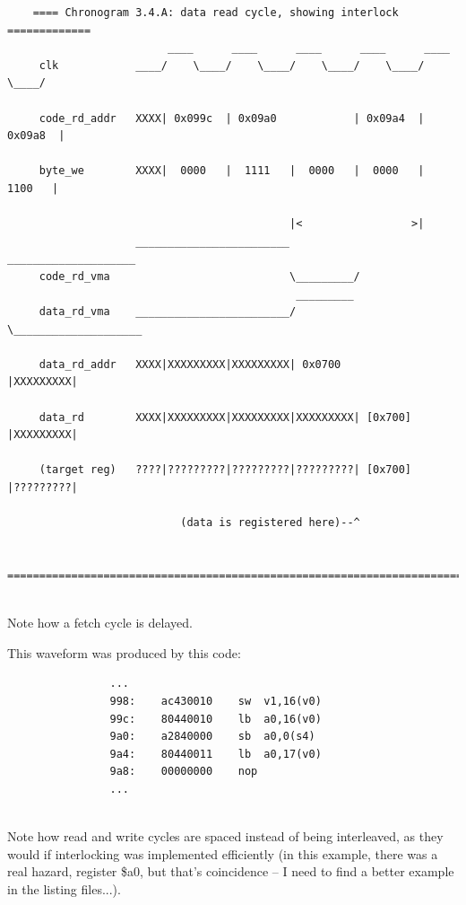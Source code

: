     
\begin{verbatim}
    ==== Chronogram 3.4.A: data read cycle, showing interlock =============
                         ____      ____      ____      ____      ____
     clk            ____/    \____/    \____/    \____/    \____/    \____/

     code_rd_addr   XXXX| 0x099c  | 0x09a0            | 0x09a4  | 0x09a8  |
     
     byte_we        XXXX|  0000   |  1111   |  0000   |  0000   |  1100   |
     
                                            |<                 >|
                    ________________________           ____________________
     code_rd_vma                            \_________/               
                                             _________                    
     data_rd_vma    ________________________/         \____________________

     data_rd_addr   XXXX|XXXXXXXXX|XXXXXXXXX| 0x0700            |XXXXXXXXX|

     data_rd        XXXX|XXXXXXXXX|XXXXXXXXX|XXXXXXXXX| [0x700] |XXXXXXXXX|

     (target reg)   ????|?????????|?????????|?????????| [0x700] |?????????|

                           (data is registered here)--^

    ========================================================================
\end{verbatim}\\

    Note how a fetch cycle is delayed.

    This waveform was produced by this code:

\begin{verbatim}    
                ...
                998:    ac430010    sw  v1,16(v0)
                99c:    80440010    lb  a0,16(v0)
                9a0:    a2840000    sb  a0,0(s4)
                9a4:    80440011    lb  a0,17(v0)
                9a8:    00000000    nop
                ...
\end{verbatim}\\

    Note how read and write cycles are spaced instead of being interleaved, as
    they would if interlocking was implemented efficiently (in this example, 
    there was a real hazard, register \$a0, but that's coincidence -- I need to
    find a better example in the listing files...).
    
